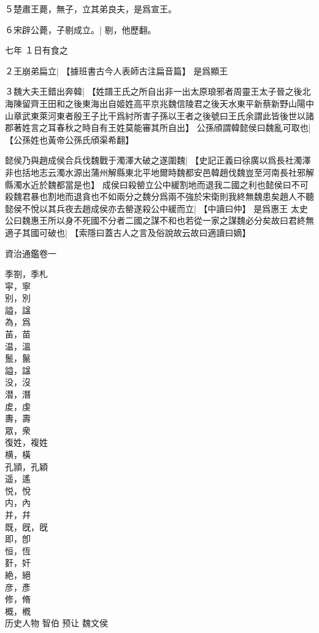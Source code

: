 ５楚肅王薨，無子，立其弟良夫，是爲宣王。

６宋辟公薨，子剔成立。|{
	剔，他歷翻。
	}



七年
１日有食之

２王崩弟扁立|{
	【據班書古今人表師古注扁音篇】
	}
是爲顯王

３魏大夫王錯出奔韓|{
	【姓譜王氏之所自出非一出太原琅邪者周靈王太子晉之後北海陳留齊王田和之後東海出自姬姓高平京兆魏信陵君之後天水東平新蔡新野山陽中山章武東萊河東者殷王子比干爲紂所害子孫以王者之後號曰王氏余謂此皆後世以諸郡著姓言之耳春秋之時自有王姓莫能審其所自出】
	}
公孫頎謂韓懿侯曰魏亂可取也|{
	【公孫姓也黃帝公孫氏頎渠希翻】
	}

懿侯乃與趙成侯合兵伐魏戰于濁澤大破之遂圍魏|{
	【史記正義曰徐廣以爲長社濁澤非也括地志云濁水源出蒲州解縣東北平地爾時魏都安邑韓趙伐魏豈至河南長社邪解縣濁水近於魏都當是也】
	}
成侯曰殺罃立公中緩割地而退我二國之利也懿侯曰不可殺魏君暴也割地而退貪也不如兩分之魏分爲兩不強於宋衛則我終無魏患矣趙人不聽懿侯不悅以其兵夜去趙成侯亦去罃遂殺公中緩而立|{
	【中讀曰仲】
	}
是爲惠王
太史公曰魏惠王所以身不死國不分者二國之謀不和也若從一家之謀魏必分矣故曰君終無適子其國可破也|{
	【索隱曰蓋古人之言及俗說故云故曰適讀曰嫡】
	}


資治通鑑卷一
\newpage


季劄，季札\\
寜，寧\\
别，別\\
謚，諡\\
為，爲\\
苖，苗\\
温，溫\\
鬛，鬣\\
謚，諡\\
没，沒\\
潜，潛\\
䖍，虔\\
夀，壽\\
眾，衆\\
復姓，複姓\\
横，橫\\
孔頴，孔穎\\
遥，遙\\
悦，悅\\
内，內\\
并，幷\\
既，旣，旣\\
即，卽\\
恒，恆\\
姧，奸\\
絶，絕\\
彦，彥\\
修，脩\\
概，槪\\

历史人物
智伯
预让
魏文侯
